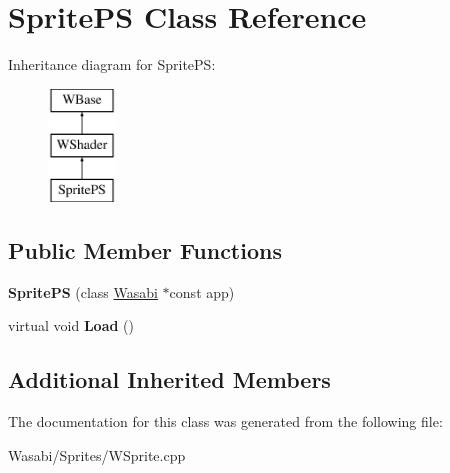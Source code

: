 \hypertarget{class_sprite_p_s}{}\section{Sprite\+PS Class Reference}
\label{class_sprite_p_s}
Inheritance diagram for Sprite\+PS\+:\begin{figure}[H]
\begin{center}
\leavevmode
\includegraphics[height=3.000000cm]{class_sprite_p_s}
\end{center}
\end{figure}
\subsection*{Public Member Functions}
\begin{DoxyCompactItemize}
\item 
{\bfseries Sprite\+PS} (class \hyperlink{class_wasabi}{Wasabi} $\ast$const app)\hypertarget{class_sprite_p_s_a7b9bc0c25054aa821d27c0af7a6bd1e5}{}\label{class_sprite_p_s_a7b9bc0c25054aa821d27c0af7a6bd1e5}

\item 
virtual void {\bfseries Load} ()\hypertarget{class_sprite_p_s_a4791a5cc708e8419f6d8b20a64b678d3}{}\label{class_sprite_p_s_a4791a5cc708e8419f6d8b20a64b678d3}

\end{DoxyCompactItemize}
\subsection*{Additional Inherited Members}


The documentation for this class was generated from the following file\+:\begin{DoxyCompactItemize}
\item 
Wasabi/\+Sprites/W\+Sprite.\+cpp\end{DoxyCompactItemize}
